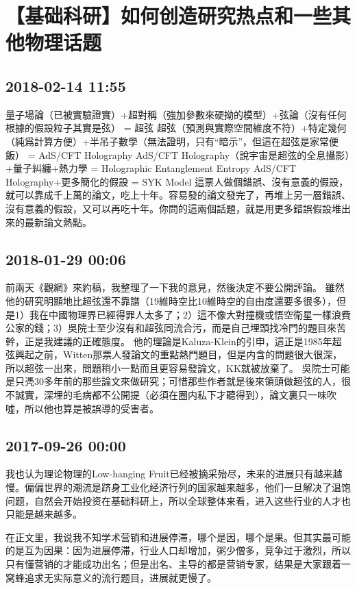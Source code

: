\documentclass[twocolumn]{ctexart}
\begin{document}
\section*{【基础科研】如何创造研究热点和一些其他物理话题}
\subsection*{2018-02-14 11:55}

量子場論（已被實驗證實）+超對稱（強加參數來硬拗的模型）+弦論（沒有任何根據的假設粒子其實是弦） = 超弦
超弦（預測與實際空間維度不符）+特定幾何（純爲計算方便）+半吊子數學（無法證明，只有“暗示”，但這在超弦是家常便飯） = AdS/CFT Holography
AdS/CFT Holography（說宇宙是超弦的全息攝影）+量子糾纏+熱力學 = Holographic Entanglement Entropy
AdS/CFT Holography+更多簡化的假設 = SYK Model
這票人做個錯誤、沒有意義的假設，就可以靠成千上萬的論文，吃上十年。容易發的論文發完了，再堆上另一層錯誤、沒有意義的假設，又可以再吃十年。你問的這兩個話題，就是用更多錯誤假設堆出來的最新論文熱點。
\subsection*{2018-01-29 00:06}

前兩天《觀網》來約稿，我整理了一下我的意見，然後決定不要公開評論。
雖然他的研究明顯地比超弦還不靠譜（19維時空比10維時空的自由度還要多很多），但是1）我在中國物理界已經得罪人太多了；2）這不像大對撞機或悟空衛星一樣浪費公家的錢；3）吳院士至少沒有和超弦同流合污，而是自己埋頭找冷門的題目來苦幹，正是我建議的正確態度。
他的理論是Kaluza-Klein的引申，這正是1985年超弦興起之前，Witten那票人發論文的重點熱門題目，但是内含的問題很大很深，所以超弦一出來，問題稍小一點而且更容易發論文，KK就被放棄了。
吳院士可能是只凴30多年前的那些論文來做研究；可惜那些作者就是後來領頭做超弦的人，很不誠實，深埋的毛病都不公開提（必須在圈内私下才聽得到），論文裏只一味吹噓，所以他也算是被誤導的受害者。
\subsection*{2017-09-26 00:00}
我也认为理论物理的Low-hanging Fruit已经被摘采殆尽，未来的进展只有越来越慢。偏偏世界的潮流是跻身工业化经济行列的国家越来越多，他们一旦解决了温饱问题，自然会开始投资在基础科研上，所以全球整体来看，进入这些行业的人才也只能是越来越多。

在正文里，我说我不知学术营销和进展停滞，哪个是因，哪个是果。但其实最可能的是互为因果：因为进展停滞，行业人口却增加，粥少僧多，竞争过于激烈，所以只有懂营销的才能成功出名；但是出名、主导的都是营销专家，结果是大家跟着一窝蜂追求无实际意义的流行题目，进展就更慢了。
\end{document}
